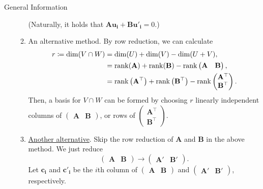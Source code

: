 \documentclass[../Notes.tex]{subfiles}
\begin{document}
\begin{stbox}{General Information}
\begin{itemize}
\begin{enumerate}
            (Naturally, it holds that \(\mathbf{A}\mathbf{u_i}+\mathbf{B}\mathbf{u'_i}=0\).)
            \item An alternative method. By row reduction, we can calculate
            \begin{align*}
                r\coloneq\dim(V\cap W)&=\dim(U)+\dim(V)-\dim(U+V),\\
                &=\operatorname{rank}(\mathbf{A})+\operatorname{rank}(\mathbf{B})-\operatorname{rank}
                \begin{pmatrix}
                    \mathbf{A}&\mathbf{B}
                \end{pmatrix},\\
                &=\operatorname{rank}\left(\mathbf{A}^\top\right)+\operatorname{rank}\left(\mathbf{B}^\top\right)-\operatorname{rank}
                \begin{pmatrix}
                    \mathbf{A}^\top\\
                    \mathbf{B}^\top
                \end{pmatrix}.
            \end{align*}
            Then, a basis for \(V\cap W\) can be formed by choosing \(r\) linearly independent columns of 
            \(\begin{pmatrix}
                \mathbf{A}&\mathbf{B}
            \end{pmatrix}\),
                or rows of \(\begin{pmatrix}
                \mathbf{A}^\top\\
                \mathbf{B}^\top
            \end{pmatrix}\).
            \item \href{https://math.stackexchange.com/a/802878}{Another alternative}. Skip the row reduction of \(\mathbf{A}\) and \(\mathbf{B}\) in the above method. We just reduce
        \[\begin{pmatrix}
            \mathbf{A}&\mathbf{B}
        \end{pmatrix}\to
        \begin{pmatrix}
            \mathbf{A'}&\mathbf{B'}
        \end{pmatrix}.\]
        Let \(\mathbf{c_i}\) and \(\mathbf{c'_i}\) be the \(i\)th column of 
        \(\begin{pmatrix}
            \mathbf{A}&\mathbf{B}
        \end{pmatrix}\) and
        \(\begin{pmatrix}
            \mathbf{A'}&\mathbf{B'}
        \end{pmatrix}\), respectively.

\end{enumerate}
\end{itemize}
\end{stbox}
\end{document}
